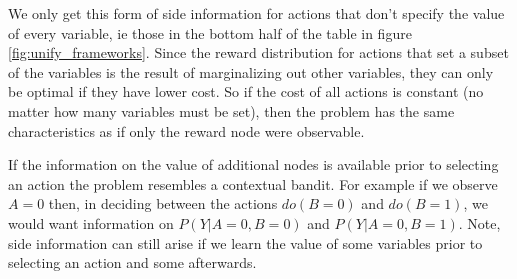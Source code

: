 \documentclass[11pt,a4paper]{article}
\begin{document}
We only get this form of side information for actions that don't specify the value of every variable, ie those in the bottom half of the table in figure \ref{fig:unify_frameworks}. Since the reward distribution for actions that set a subset of the variables is the result of marginalizing out other variables, they can only be optimal if they have lower cost. So if the cost of all actions is constant (no matter how many variables must be set), then the problem has the same characteristics as if only the reward node were observable.

If the information on the value of additional nodes is available prior to selecting an action the problem resembles a contextual bandit. For example if we observe $A = 0$ then, in deciding between the actions $do(B=0)$ and $do(B=1)$, we would want information on $P(Y|A=0,B=0)$ and $P(Y|A=0,B=1)$.  Note, side information can still arise if we learn the value of some variables prior to selecting an action and some afterwards. 
\end{document}
